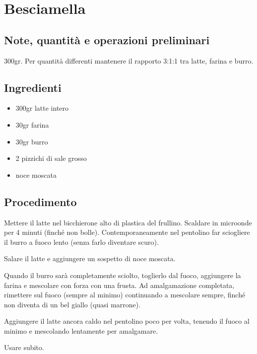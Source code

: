 \documentclass[12pt]{article}
\begin{document}
\newpage


\section{Besciamella}

\subsection*{Note, quantità e operazioni preliminari}
300gr. Per quantità differenti mantenere il rapporto 3:1:1 tra
latte, farina e burro.

\bigskip
\bigskip

\begin{multicols}{2}
\subsection*{Ingredienti}
\begin{itemize}
	\item 300gr latte intero
	\item 30gr farina
	\item 30gr burro
	\item 2 pizzichi di sale grosso
	\item noce moscata
\end{itemize}

\vspace*{\fill}

\columnbreak
\subsection*{Procedimento}

Mettere il latte nel bicchierone alto di plastica del
frullino. Scaldare in microonde per 4 minuti (finché
non bolle). Contemporaneamente nel pentolino far sciogliere
il burro a fuoco lento (senza farlo diventare scuro).
\medskip

Salare il latte e aggiungere un sospetto di noce moscata.
\medskip

Quando il burro sarà completamente sciolto, toglierlo dal fuoco,
aggiungere la farina e mescolare con forza con una frusta.
Ad amalgamazione completata, rimettere sul fuoco
(sempre al minimo) continuando a mescolare sempre, finché non
diventa di un bel giallo (quasi marrone).
\medskip

Aggiungere il latte ancora caldo nel pentolino poco per volta,
tenendo il fuoco al minimo e mescolando lentamente per amalgamare.
\medskip

Usare subito.

\end{multicols}
\end{document}
